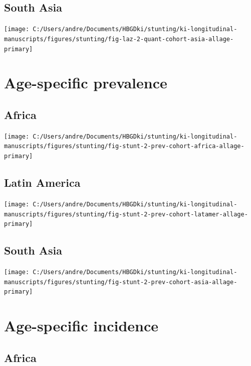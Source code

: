 \documentclass[
  9pt,
]{book}
\begin{document}
\hypertarget{south-asia}{%
\subsection{South Asia}\label{south-asia}}

\texttt{[image: C:/Users/andre/Documents/HBGDki/stunting/ki-longitudinal-manuscripts/figures/stunting/fig-laz-2-quant-cohort-asia-allage-primary]}

\hypertarget{age-specific-prevalence}{%
\section{Age-specific prevalence}\label{age-specific-prevalence}}

\hypertarget{africa-1}{%
\subsection{Africa}\label{africa-1}}

\texttt{[image: C:/Users/andre/Documents/HBGDki/stunting/ki-longitudinal-manuscripts/figures/stunting/fig-stunt-2-prev-cohort-africa-allage-primary]}

\hypertarget{latin-america-1}{%
\subsection{Latin America}\label{latin-america-1}}

\texttt{[image: C:/Users/andre/Documents/HBGDki/stunting/ki-longitudinal-manuscripts/figures/stunting/fig-stunt-2-prev-cohort-latamer-allage-primary]}

\hypertarget{south-asia-1}{%
\subsection{South Asia}\label{south-asia-1}}

\texttt{[image: C:/Users/andre/Documents/HBGDki/stunting/ki-longitudinal-manuscripts/figures/stunting/fig-stunt-2-prev-cohort-asia-allage-primary]}

\hypertarget{age-specific-incidence}{%
\section{Age-specific incidence}\label{age-specific-incidence}}

\hypertarget{africa-2}{%
\subsection{Africa}\label{africa-2}}
\end{document}
